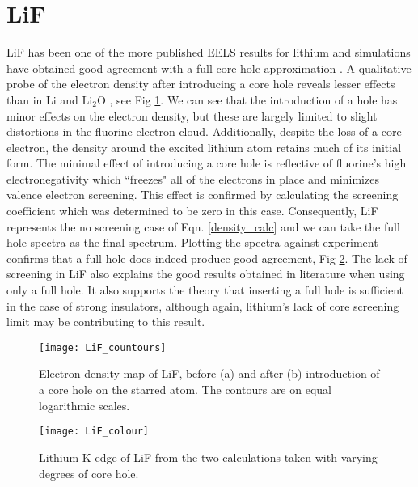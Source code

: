 \section{LiF}
LiF has been one of the more published EELS results for lithium and simulations have obtained good agreement with a full core hole approximation \cite{mauchamp_ab_2006}.  A qualitative probe of the electron density after introducing a core hole reveals lesser effects than in Li and $ \mathrm{Li_2O} $ , see Fig \ref{LiF_countours}.  We can see that the introduction of a hole has minor effects on the electron density, but these are largely limited to slight distortions in the fluorine electron cloud. Additionally, despite the loss of a core electron, the density around the excited lithium atom retains much of its initial form. The minimal effect of introducing a core hole is reflective of fluorine's high electronegativity which ``freezes" all of the electrons in place and minimizes valence electron screening.  This effect is confirmed by calculating the screening coefficient which was determined to be zero in this case. Consequently, LiF represents the no screening case of Eqn. \ref{density_calc} and we can take the full hole spectra as the final spectrum.  Plotting the spectra against experiment confirms that a full hole does indeed produce good agreement, Fig \ref{LiF_spectra}.  The lack of screening in LiF also explains the good results obtained in literature when using only a full hole.  It also supports the theory that inserting a full hole is sufficient in the case of strong insulators, although again, lithium's lack of core screening limit may be contributing to this result.

\begin{figure}
	\centering
	\texttt{[image: LiF\_countours]}
	\caption{Electron density map of LiF, before (a) and after (b) introduction of a core hole on the starred atom.  The contours are on equal logarithmic scales.}
	\label{LiF_countours}
\end{figure}

\begin{figure}
	\centering
	\texttt{[image: LiF\_colour]}
	\caption{Lithium K edge of LiF from the two calculations taken with varying degrees of core hole. }
	\label{LiF_spectra}
\end{figure}



